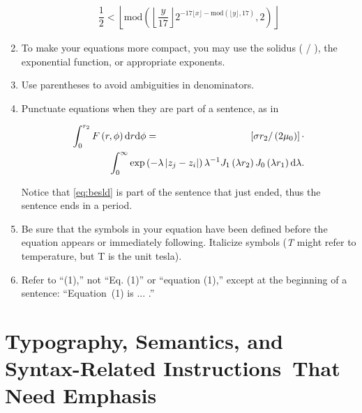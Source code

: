 \begin{enumerate}
\begin{eqnarray}
\dfrac{1}{2} < \left\lfloor \mathrm{mod}\left(\left\lfloor \dfrac{y}{17} \right\rfloor 2^{-17 \lfloor x \rfloor - \mathrm{mod}(\lfloor y\rfloor, 17)},2\right)\right\rfloor
\label{eq:rn}
\end{eqnarray}




	\item To make your equations more compact, you may use the solidus ( / ), the exponential function, or appropriate exponents.

	\item  Use parentheses to avoid ambiguities in denominators. 
	
	\item Punctuate equations when they are part of a sentence, as in

\setlength{\arraycolsep}{0.0em}
\begin{eqnarray}
\int_0^{r_2} F \left(r, \phi \right) \mathrm{d}r \mathrm{d} \phi &{} = {}&  
\left[\sigma r_2 / \left( 2 \mu_0 \right) \right] \cdot \nonumber\\
&& \hspace{-6em} \int_0^\infty \exp 
\left(-\lambda \left| z_j - z_i  
\right| \right) \lambda^{-1} 
J_1 \left( \lambda r_2 \right)
J_0 \left( \lambda r_1 \right) 
\mathrm{d}\lambda .
\label{eq:besld}
\end{eqnarray}
\setlength{\arraycolsep}{5pt}

 Notice that \eqref{eq:besld} is part of the sentence that just ended, thus the sentence ends in a period.

	\item Be sure that the symbols in your equation have been defined before the equation appears or immediately following. Italicize symbols (\textit{T} might refer to temperature, but T is the unit tesla). 
	
	\item Refer to ``(1),'' not ``Eq. (1)'' or ``equation (1),'' except at the beginning of a sentence: ``Equation~(1) is ... .''

\end{enumerate}














\section{Typography, Semantics, and Syntax-Related Instructions~That Need Emphasis}

